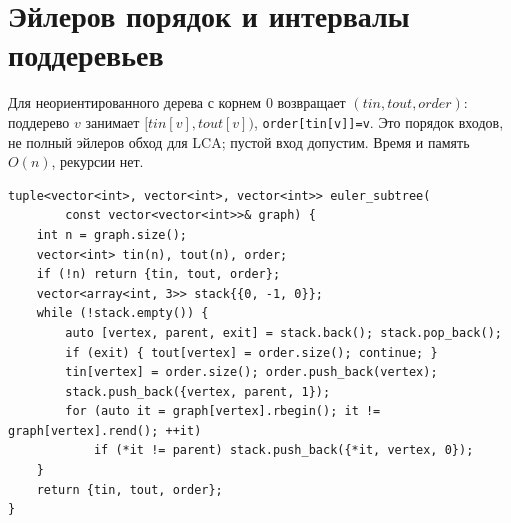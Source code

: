 \section{Эйлеров порядок и интервалы поддеревьев}
Для неориентированного дерева с корнем 0 возвращает $(tin,tout,order)$: поддерево $v$ занимает $[tin[v],tout[v])$, \texttt{order[tin[v]]=v}.
Это порядок входов, не полный эйлеров обход для LCA; пустой вход допустим.
Время и память $O(n)$, рекурсии нет.
\begin{lstlisting}[name=euler_subtree]
tuple<vector<int>, vector<int>, vector<int>> euler_subtree(
        const vector<vector<int>>& graph) {
    int n = graph.size();
    vector<int> tin(n), tout(n), order;
    if (!n) return {tin, tout, order};
    vector<array<int, 3>> stack{{0, -1, 0}};
    while (!stack.empty()) {
        auto [vertex, parent, exit] = stack.back(); stack.pop_back();
        if (exit) { tout[vertex] = order.size(); continue; }
        tin[vertex] = order.size(); order.push_back(vertex);
        stack.push_back({vertex, parent, 1});
        for (auto it = graph[vertex].rbegin(); it != graph[vertex].rend(); ++it)
            if (*it != parent) stack.push_back({*it, vertex, 0});
    }
    return {tin, tout, order};
}
\end{lstlisting}
%

\iffalse
